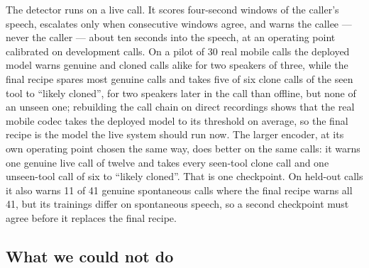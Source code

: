 The detector runs on a live call. It scores four-second windows of the caller's
speech, escalates only when consecutive windows agree, and warns the callee --- never
the caller --- about ten seconds into the speech, at an operating point calibrated on
development calls. On a pilot of 30 real mobile calls the deployed model warns genuine and
cloned calls alike for two speakers of three, while the final recipe spares most genuine
calls and takes five of six clone calls of the seen tool to ``likely cloned'', for two speakers
later in the call than offline, but none of an unseen one;
rebuilding the call chain on direct
recordings shows that the real mobile codec takes the deployed model to its threshold on average, so the final
recipe is the model the live system should run now. The larger encoder, at its own operating
point chosen the same way, does better on the same calls: it warns one genuine live call of
twelve and takes every seen-tool clone call and one unseen-tool call of six to ``likely
cloned''. That is one checkpoint. On held-out calls it also warns 11 of 41 genuine
spontaneous calls where the final recipe warns all 41, but its trainings differ on spontaneous
speech, so a second checkpoint must agree before it replaces the final recipe.

\subsection{What we could not do}

